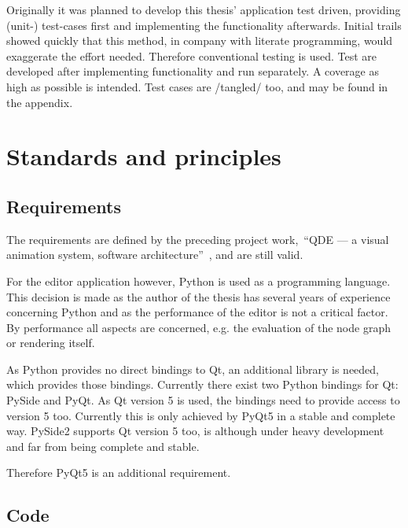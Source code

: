 \documentclass[
    a4paper,      %
    10pt,         %
    openright,    %
    notitlepage,  %
    parskip=half, %
]{scrreprt}       %
\theoremstyle{definition}                    %
\begin{document}
Originally it was planned to develop this thesis' application test driven,
providing (unit-) test-cases first and implementing the functionality
afterwards. Initial trails showed quickly that this method, in company with
literate programming, would exaggerate the effort needed. Therefore conventional
testing is used. Test are developed after implementing functionality and run
separately. A coverage as high as possible is intended. Test cases are /tangled/
too, and may be found in the appendix.

\section{Standards and principles}
\label{sec:standards-principles}

\subsection{Requirements}
\label{subsec:requirements}

The requirements are defined by the preceding project work,~\enquote{QDE --- a
  visual animation system, software architecture}~\citep[p. 8
ff.]{osterwalder_qde_2016}, and are still valid.

For the editor application however, Python is used as a programming language.
This decision is made as the author of the thesis has several years of
experience concerning Python and as the performance of the editor is not
a critical factor. By performance all aspects are concerned, e.g. the evaluation
of the node graph or rendering itself.

As Python provides no direct bindings to Qt, an additional library is needed,
which provides those bindings. Currently there exist two Python bindings for Qt:
PySide and PyQt. As Qt version 5 is used, the bindings need to provide access to
version 5 too. Currently this is only achieved by PyQt5 in a stable and complete
way. PySide2 supports Qt version 5 too, is although under heavy development and
far from being complete and stable.

Therefore PyQt5 is an additional requirement.

\subsection{Code}
\label{subsec:code}
\end{document}
